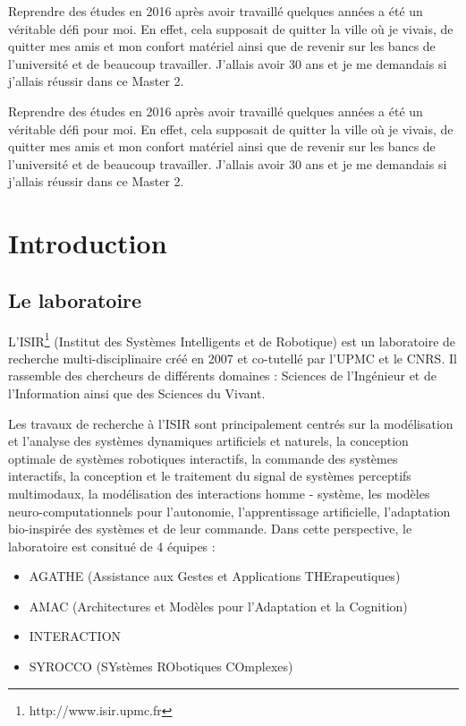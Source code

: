 \documentclass{llncs}
\begin{document}
Reprendre des études en 2016 après avoir travaillé quelques années a été un véritable défi pour moi. En effet, cela supposait de quitter la ville où je vivais, de quitter mes amis et mon confort matériel ainsi que de revenir sur les bancs de l'université et de beaucoup travailler. J'allais avoir 30 ans et je me demandais si j'allais réussir dans ce Master 2.

Reprendre des études en 2016 après avoir travaillé quelques années a été un véritable défi pour moi. En effet, cela supposait de quitter la ville où je vivais, de quitter mes amis et mon confort matériel ainsi que de revenir sur les bancs de l'université et de beaucoup travailler. J'allais avoir 30 ans et je me demandais si j'allais réussir dans ce Master 2.


\section{Introduction}


\subsection{Le laboratoire}

L'ISIR\footnote{http://www.isir.upmc.fr} (Institut des Systèmes Intelligents et de Robotique) est un laboratoire de recherche multi-disciplinaire créé en 2007 et co-tutellé par l'UPMC et le CNRS. Il rassemble des chercheurs de différents domaines : Sciences de l’Ingénieur et de l’Information ainsi que des Sciences du Vivant.

Les travaux de recherche à l'ISIR sont principalement centrés sur la modélisation et l'analyse des systèmes dynamiques artificiels et naturels, la conception optimale de systèmes robotiques interactifs, la commande des systèmes interactifs, la conception et le traitement du signal de systèmes perceptifs multimodaux, la modélisation des interactions homme - système, les modèles neuro-computationnels pour l’autonomie, l'apprentissage artificielle, l'adaptation bio-inspirée des systèmes et de leur commande. Dans cette perspective, le laboratoire est consitué de 4 équipes :
\begin{itemize}
\item AGATHE (Assistance aux Gestes et Applications THErapeutiques)
\item AMAC (Architectures et Modèles pour l'Adaptation et la Cognition)
\item INTERACTION
\item SYROCCO (SYstèmes RObotiques COmplexes)
\end{itemize}
\end{document}
